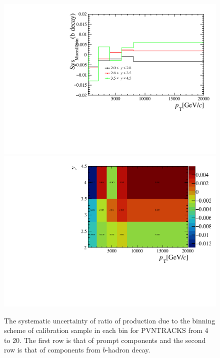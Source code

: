 \begin{itemize}
\begin{figure}[!tbp]
\begin{center}
      \includegraphics[width=0.49\linewidth]{pdf/SysPID/n1InBinErrb_point.pdf}
      \includegraphics[width=0.49\linewidth]{pdf/SysPID/n1InBinErrb.pdf}
    \end{center}
    \caption{The systematic uncertainty of ratio of production due to the binning scheme of calibration sample in each bin for PVNTRACKS from 4 to 20. The first row is that of prompt components and the second row is that of components from $b$-hadron decay.
      }
    \label{Sys_PID2}
\end{figure}
\end{itemize}


